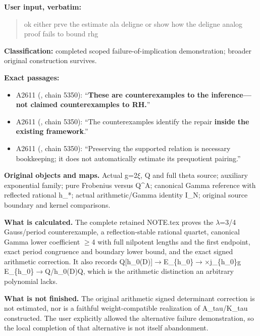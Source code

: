 \textbf{User input, verbatim:}

\begin{quote}
ok either prve the estimate ala deligne or show how the deligne analog
proof fails to bound rhg
\end{quote}

\textbf{Classification:} completed scoped failure-of-implication
demonstration; broader original construction survives.

\textbf{Exact passages:}

\begin{itemize}
\tightlist
\item
  A2611 (\protect{}, chain
  5350): ``\textbf{These are counterexamples to the inference---not
  claimed counterexamples to RH.}''
\item
  A2611 (\protect{}, chain
  5350): ``The counterexamples identify the repair \textbf{inside the
  existing framework}.''
\item
  A2611 (\protect{}, chain
  5350): ``Preserving the supported relation is necessary bookkeeping;
  it does not automatically estimate its prequotient pairing.''
\end{itemize}

\textbf{Original objects and maps.} Actual
g=2\allowbreak{}\ensuremath{ξ}\allowbreak{}, Q and full theta source;
auxiliary exponential family; pure Frobenius versus Q\^{}A; canonical
Gamma reference with reflected rational h\_*; actual arithmetic/Gamma
identity I\_N; original source boundary and kernel comparisons.

\textbf{What is calculated.} The complete retained NOTE.tex proves the
\allowbreak{}\ensuremath{λ}\allowbreak{}=3/4 Gauss/period
counterexample, a reflection-stable rational quartet, canonical Gamma
lower coefficient \allowbreak{}\ensuremath{≥}\allowbreak{}4 with full
nilpotent lengths and the first endpoint, exact period congruence and
boundary lower bound, and the exact signed arithmetic correction. It
also records
Q[h\_0(D)]\allowbreak{}\ensuremath{→}\allowbreak{}E\_\{h\_0\}\allowbreak{}\ensuremath{→}\allowbreak{}\allowbreak{}\ensuremath{×}\allowbreak{}j\_\{h\_0\}g
E\_\{h\_0\}\allowbreak{}\ensuremath{→}\allowbreak{}Q/h\_0(D)Q, which is
the arithmetic distinction an arbitrary polynomial lacks.

\textbf{What is not finished.} The original arithmetic signed
determinant correction is not estimated, nor is a faithful
weight-compatible realization of A\_tau/K\_tau constructed. The user
explicitly allowed the alternative failure demonstration, so the local
completion of that alternative is not itself abandonment.

